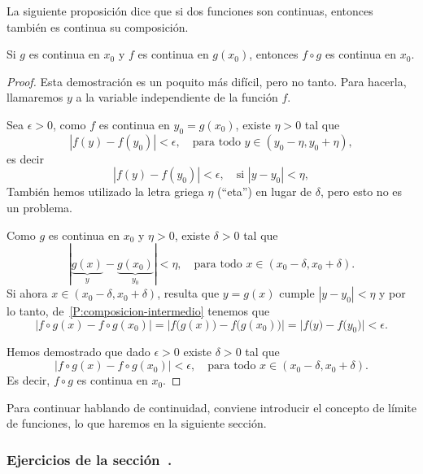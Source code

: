La siguiente proposición dice que si dos funciones son continuas, entonces también es continua su composición.

\begin{proposition}
    Si $g$ es continua en $x_0$ y $f$ es continua en $g(x_0)$, entonces $f\circ g$ es continua en $x_0$.
\end{proposition}

\begin{proof}
Esta demostración es un poquito más difícil, pero no tanto.
Para hacerla, llamaremos $y$ a la variable independiente de la función $f$.

Sea $\epsilon>0$, como $f$ es continua en $y_0=g(x_0)$, existe $\eta>0$ tal que
\[
|f(y)-f(y_0)|<\epsilon, \quad\text{para todo $y\in(y_0-\eta,y_0+\eta)$},
\]
es decir
\begin{equation}\label{P:composicion-intermedio}
|f(y)-f(y_0)|<\epsilon, \quad\text{si $|y-y_0|<\eta$},
\end{equation}
También hemos utilizado la letra griega $\eta$ (``eta'') en lugar de $\delta$, pero esto no es un problema.


Como $g$ es continua en $x_0$ y $\eta>0$, existe $\delta>0$ tal que 
\[
|\underbrace{g(x)}_y-\underbrace{g(x_0)}_{y_0}|<\eta, \quad\text{para todo $x\in(x_0-\delta,x_0+\delta)$}.
\]
Si ahora $x\in(x_0-\delta,x_0+\delta)$, resulta que $y=g(x)$ cumple $|y-y_0|<\eta$ y por lo tanto, de~\eqref{P:composicion-intermedio} tenemos que
\[
|f\circ g(x)-f\circ g(x_0) | 
=\big|f\big(g(x)\big)-f\big(g(x_0)\big) \big| 
=\big|f\big(y\big)-f\big(y_0\big) \big| <\epsilon.
\]

Hemos demostrado que dado $\epsilon>0$ existe $\delta>0$ tal que
\[
        |f\circ g(x)-f\circ g(x_0) |  <\epsilon,
        \quad\text{para todo $x\in(x_0-\delta,x_0+\delta)$}.
\]
Es decir, $f\circ g$ es continua en $x_0$.
\end{proof}

Para continuar hablando de continuidad, conviene introducir el concepto de límite de funciones, lo que haremos en la siguiente sección.

\subsubsection*{Ejercicios de la sección~.}

